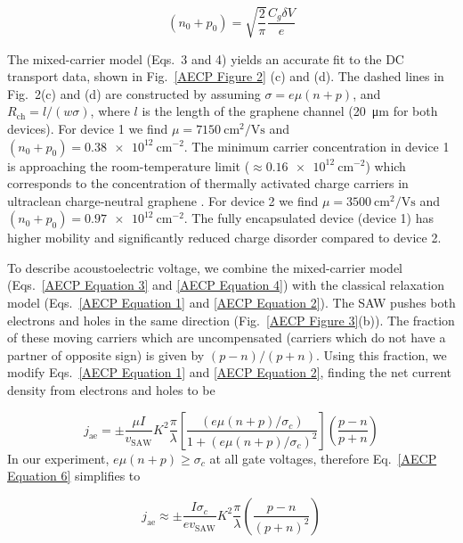 \documentclass[double,12pt,1in,seploa]{beavtex}
\begin{document}
\begin{equation}
    (n_0 + p_0) = \sqrt{\frac{2}{\pi}}\frac{C_g \delta V}{e}
    \label{AECP Equation 5}
\end{equation}

The mixed-carrier model (Eqs.\ 3 and 4) yields an accurate fit to the DC transport data, shown in Fig.\ \ref{AECP Figure 2} (c) and (d). The dashed lines in Fig.\ 2(c) and (d) are constructed by assuming $\sigma = e\mu(n + p)$, and $R_{\mathrm{ch}} = l/(w\sigma)$, where $l$ is the length of the graphene channel (\SI{20}{\micro\meter} for both devices). For device 1 we find $\mu = \SI{7150}{\centi\meter^2/\volt\second}$ and $(n_0+p_0) =  \SI{0.38e12}{\centi\meter^{-2}}$. The minimum carrier concentration in device 1 is approaching the room-temperature limit ($\approx \SI{0.16e12}{\centi\meter^{-2}}$) which corresponds to the concentration of thermally activated charge carriers in ultraclean charge-neutral graphene \cite{xin_giant_2023}.  For device 2 we find $\mu = \SI{3500}{\centi\meter^2/\volt\second}$ and $(n_0+p_0) =\SI{0.97e12}{\centi\meter^{-2}}$. The fully encapsulated device (device 1) has higher mobility and significantly reduced charge disorder compared to device 2. 

To describe acoustoelectric voltage, we combine the mixed-carrier model (Eqs.\ \ref{AECP Equation 3} and \ref{AECP Equation 4}) with the classical relaxation model (Eqs.\ \ref{AECP Equation 1} and \ref{AECP Equation 2}). The SAW pushes both electrons and holes in the same direction (Fig.\ \ref{AECP Figure 3}(b)). The fraction of these moving carriers which are uncompensated (carriers which do not have a partner of opposite sign) is given by $(p-n)/(p+n)$.  Using this fraction, we modify Eqs.\ \ref{AECP Equation 1} and \ref{AECP Equation 2}, finding the net current density from electrons and holes to be

\begin{equation}
    j_{\mathrm{ae}} = \pm \frac{\mu I}{v_{\mathrm{SAW}}}K^2\frac{\pi}{\lambda}\left[\frac{(e\mu(n+p)/\sigma_c)}{1+ (e\mu(n+p)/\sigma_c)^2}\right]\left(\frac{p-n}{p+n}\right)
    \label{AECP Equation 6}
\end{equation}
In our experiment, $e\mu(n + p) \geq \sigma_c$ at all gate voltages, therefore Eq.\ \ref{AECP Equation 6} simplifies to 

\begin{equation}
    j_{\mathrm{ae}} \approx \pm \frac{I \sigma_c}{e v_{\mathrm{SAW}}}K^2\frac{\pi}{\lambda}\left(\frac{p-n}{(p+n)^2}\right)
    \label{AECP Equation 7}
\end{equation}
\end{document}
